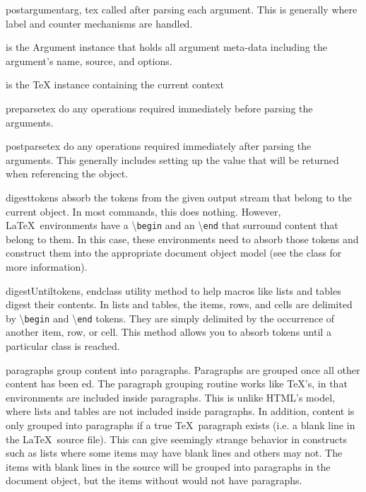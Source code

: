 \documentclass{manual}
\newcommand{\macro}[1]{\textbackslash\texttt{#1}}
\begin{document}
\begin{methoddesc}[Macro]{postargument}{arg, tex}
called after parsing each argument. This is generally where label and
counter mechanisms are handled.

 is the Argument instance that holds all argument meta-data
    including the argument's name, source, and options.

 is the TeX instance containing the current context 
\end{methoddesc}

\begin{methoddesc}[Macro]{preparse}{tex}
do any operations required immediately before parsing the arguments.
\end{methoddesc}

\begin{methoddesc}[Macro]{postparse}{tex}
do any operations required immediately after parsing the arguments.  This
generally includes setting up the value that will be returned when 
referencing the object.
\end{methoddesc}

\begin{methoddesc}[Macro]{digest}{tokens}
absorb the tokens from the given output stream that belong to the current
object.  In most commands, this does nothing.  However, \LaTeX\ environments
have a \macro{begin} and an \macro{end} that surround content that belong 
to them.  In this case, these environments need to absorb those tokens 
and construct them into the appropriate document object model (see the
 class for more information).
\end{methoddesc}

\begin{methoddesc}[Macro]{digestUntil}{tokens, endclass}
utility method to help macros like lists and tables digest their contents.
In lists and tables, the items, rows, and cells are delimited by 
\macro{begin} and \macro{end} tokens.  They are simply delimited by the
occurrence of another item, row, or cell.  This method allows you to
absorb tokens until a particular class is reached.
\end{methoddesc}

\begin{methoddesc}[Macro]{paragraphs}{}
group content into paragraphs.  Paragraphs are grouped once all other
content has been ed.  The paragraph grouping routine works
like \TeX's, in that environments are included inside paragraphs.  This 
is unlike HTML's model, where lists and tables are not included inside 
paragraphs.  In addition, content is only grouped into paragraphs if
a true \TeX\ paragraph exists (i.e. a blank line in the \LaTeX\ source file).
This can give seemingly strange behavior in constructs such as lists where
some items may have blank lines and others may not.  The items with blank
lines in the source will be grouped into paragraphs in the document 
object, but the items without would not have paragraphs.
\end{methoddesc}
\end{document}
